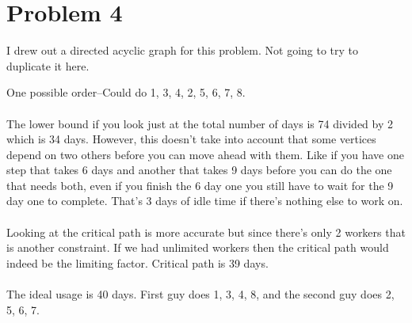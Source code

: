 \documentclass{article}
\begin{document}
\section {Problem 4}
I drew out a directed acyclic graph for this problem. Not going to try to duplicate it here.

One possible order--Could do 1, 3, 4, 2, 5, 6, 7, 8.
\\\\
The lower bound if you look just at the total number of days is 74 divided by 2 which is 34 days. However, this doesn't take into account that some vertices depend on two others before you can move ahead with them. Like if you have one step that takes 6 days and another that takes 9 days before you can do the one that needs both, even if you finish the 6 day one you still have to wait for the 9 day one to complete. That's 3 days of idle time if there's nothing else to work on. 
\\\\
Looking at the critical path is more accurate but since there's only 2 workers that is another constraint. If we had unlimited workers then the critical path would indeed be the limiting factor. Critical path is 39 days.
\\\\
The ideal usage is 40 days. First guy does 1, 3, 4, 8, and the second guy does 2, 5, 6, 7.
\end{document}
